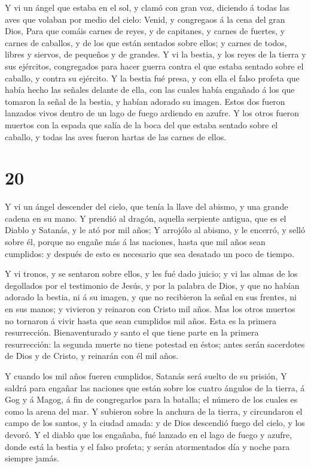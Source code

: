  Y vi un ángel que estaba en el sol, y clamó con gran voz,
diciendo á todas las aves que volaban por medio del cielo: Venid, y
congregaos á la cena del gran Dios,  Para que comáis carnes
de reyes, y de capitanes, y carnes de fuertes, y carnes de caballos, y
de los que están sentados sobre ellos; y carnes de todos, libres y
siervos, de pequeños y de grandes.  Y vi la bestia, y los
reyes de la tierra y sus ejércitos, congregados para hacer guerra contra
el que estaba sentado sobre el caballo, y contra su ejército.
 Y la bestia fué presa, y con ella el falso profeta que
había hecho las señales delante de ella, con las cuales había engañado á
los que tomaron la señal de la bestia, y habían adorado su imagen. Estos
dos fueron lanzados vivos dentro de un lago de fuego ardiendo en azufre.
 Y los otros fueron muertos con la espada que salía de la
boca del que estaba sentado sobre el caballo, y todas las aves fueron
hartas de las carnes de ellos.

\hypertarget{section-19}{%
\section{20}\label{section-19}}

 Y vi un ángel descender del cielo, que tenía la llave del
abismo, y una grande cadena en su mano.  Y prendió al
dragón, aquella serpiente antigua, que es el Diablo y Satanás, y le ató
por mil años;  Y arrojólo al abismo, y le encerró, y selló
sobre él, porque no engañe más á las naciones, hasta que mil años sean
cumplidos: y después de esto es necesario que sea desatado un poco de
tiempo.

 Y vi tronos, y se sentaron sobre ellos, y les fué dado
juicio; y vi las almas de los degollados por el testimonio de Jesús, y
por la palabra de Dios, y que no habían adorado la bestia, ni á su
imagen, y que no recibieron la señal en sus frentes, ni en sus manos; y
vivieron y reinaron con Cristo mil años.  Mas los otros
muertos no tornaron á vivir hasta que sean cumplidos mil años. Esta es
la primera resurrección.  Bienaventurado y santo el que
tiene parte en la primera resurrección: la segunda muerte no tiene
potestad en éstos; antes serán sacerdotes de Dios y de Cristo, y
reinarán con él mil años.

 Y cuando los mil años fueren cumplidos, Satanás será suelto
de su prisión,  Y saldrá para engañar las naciones que están
sobre los cuatro ángulos de la tierra, á Gog y á Magog, á fin de
congregarlos para la batalla; el número de los cuales es como la arena
del mar.  Y subieron sobre la anchura de la tierra, y
circundaron el campo de los santos, y la ciudad amada: y de Dios
descendió fuego del cielo, y los devoró.  Y el diablo que
los engañaba, fué lanzado en el lago de fuego y azufre, donde está la
bestia y el falso profeta; y serán atormentados día y noche para siempre
jamás.

